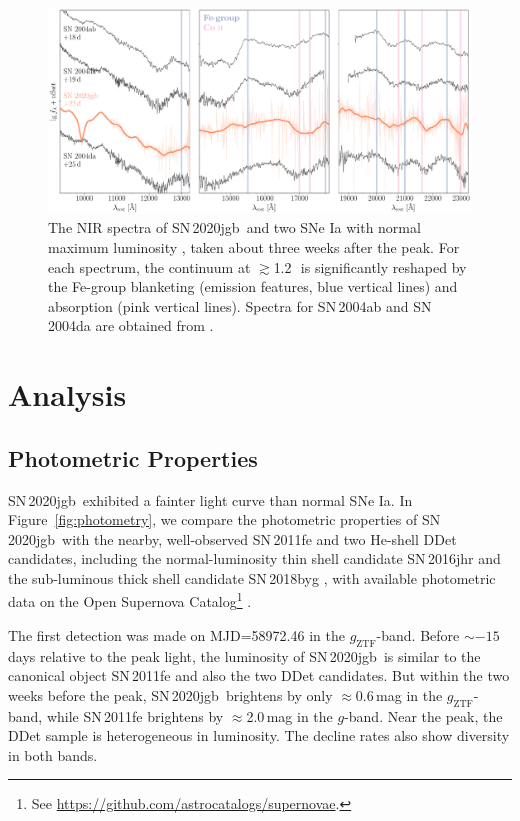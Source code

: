 \documentclass[twocolumn]{aastex631}
\newcommand{\sn}{SN\,2020jgb}
\begin{document}
\begin{figure}
    \centering
    \includegraphics[width=\textwidth]{NIR_spec.pdf}
    \caption{The NIR spectra of \sn\ and two SNe Ia with normal maximum luminosity \citep[SN\,2004ab and SN\,2004da,][]{Marion2009_NIR}, taken about three weeks after the peak. For each spectrum, the continuum at $\gtrsim$1.2\,\micron\ is significantly reshaped by the Fe-group blanketing (emission features, blue vertical lines) and  absorption (pink vertical lines). Spectra for SN\,2004ab and SN\,2004da are obtained from \citet{Marion2009_NIR}.}
    \label{fig:NIR_spec}
\end{figure}

\section{Analysis} \label{sec:analysis}
\subsection{Photometric Properties}
\sn\ exhibited a fainter light curve than normal SNe Ia. In Figure~\ref{fig:photometry}, we compare the photometric properties of \sn\ with the nearby, well-observed SN\,2011fe \citep{Nugent_11fe_2011} and two He-shell DDet candidates, including the normal-luminosity thin shell candidate SN\,2016jhr \citep{jiang_16jhr_2017} and the sub-luminous thick shell candidate SN\,2018byg \citep{de_18byg_2019}, with available photometric data on the Open Supernova Catalog\footnote{See \url{https://github.com/astrocatalogs/supernovae}.} \citep{Guillochon_2017}.

The first detection was made on MJD=58972.46 in the $g_\mathrm{ZTF}$-band. Before $\sim$$-15$\,days relative to the peak light, the luminosity of \sn\ is similar to the canonical object SN\,2011fe and also the two DDet candidates. But within the two weeks before the peak, \sn\ brightens by only $\approx$0.6\,mag in the $g_\mathrm{ZTF}$-band, while SN\,2011fe brightens by $\approx$2.0\,mag in the $g$-band. Near the peak, the DDet sample is heterogeneous in luminosity. The decline rates also show diversity in both bands.
\end{document}
